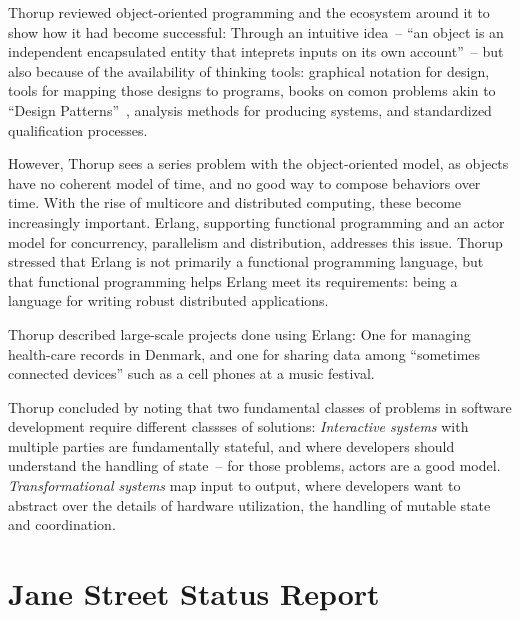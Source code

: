 \documentclass{jfp1}
\begin{document}
Thorup reviewed object-oriented programming and the ecosystem around
it to show how it had become successful: Through an intuitive idea~--
``an object is an independent encapsulated entity that inteprets
inputs on its own account''~-- but also because of the availability of
thinking tools: graphical notation for design, tools for mapping those
designs to programs, books on comon problems akin to ``Design
Patterns''~\cite{GammaHelmJohnsonVlissides1995}, analysis methods for producing systems,
and standardized qualification processes.

However, Thorup sees a series problem with the object-oriented model,
as objects have no coherent model of time, and no good way to compose
behaviors over time.  With the rise of multicore and distributed
computing, these become increasingly important.  Erlang, supporting
functional programming and an actor model for concurrency, parallelism
and distribution, addresses this issue.  Thorup stressed that Erlang
is not primarily a functional programming language, but that
functional programming helps Erlang meet its requirements: being a
language for writing robust distributed applications.

Thorup described large-scale projects done using Erlang: One for
managing health-care records in Denmark, and one for sharing data
among ``sometimes connected devices'' such as a cell phones at a music
festival.

Thorup concluded by noting that two fundamental classes of problems in
software development require different classses of solutions:
\textit{Interactive systems} with multiple parties are fundamentally
stateful, and where developers should understand the handling of
state~-- for those problems, actors are a good model.
\textit{Transformational systems} map input to output, where
developers want to abstract over the details of hardware utilization,
the handling of mutable state and coordination.

\section{Jane Street Status Report}
\end{document}
